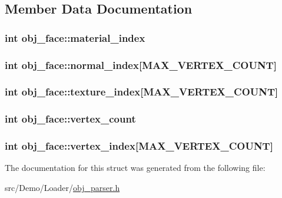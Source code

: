 \subsection{Member Data Documentation}
\hypertarget{structobj__face_ab354e6f87c96bd040a9cd6d4c4532f6b}{
\subsubsection[{material\+\_\+index}]{\setlength{\rightskip}{0pt plus 5cm}int obj\+\_\+face\+::material\+\_\+index}}\label{structobj__face_ab354e6f87c96bd040a9cd6d4c4532f6b}
\hypertarget{structobj__face_aa37ed96ceb21dde7ca0e07436f0c60bd}{
\subsubsection[{normal\+\_\+index}]{\setlength{\rightskip}{0pt plus 5cm}int obj\+\_\+face\+::normal\+\_\+index\mbox{[}{\bf M\+A\+X\+\_\+\+V\+E\+R\+T\+E\+X\+\_\+\+C\+O\+U\+N\+T}\mbox{]}}}\label{structobj__face_aa37ed96ceb21dde7ca0e07436f0c60bd}
\hypertarget{structobj__face_affde6e39f099c5f3497c3691ea66608c}{
\subsubsection[{texture\+\_\+index}]{\setlength{\rightskip}{0pt plus 5cm}int obj\+\_\+face\+::texture\+\_\+index\mbox{[}{\bf M\+A\+X\+\_\+\+V\+E\+R\+T\+E\+X\+\_\+\+C\+O\+U\+N\+T}\mbox{]}}}\label{structobj__face_affde6e39f099c5f3497c3691ea66608c}
\hypertarget{structobj__face_ac1a658f759cfb36b241a013cce1a8744}{
\subsubsection[{vertex\+\_\+count}]{\setlength{\rightskip}{0pt plus 5cm}int obj\+\_\+face\+::vertex\+\_\+count}}\label{structobj__face_ac1a658f759cfb36b241a013cce1a8744}
\hypertarget{structobj__face_a507982facfb73bcd3143d962e8aba781}{
\subsubsection[{vertex\+\_\+index}]{\setlength{\rightskip}{0pt plus 5cm}int obj\+\_\+face\+::vertex\+\_\+index\mbox{[}{\bf M\+A\+X\+\_\+\+V\+E\+R\+T\+E\+X\+\_\+\+C\+O\+U\+N\+T}\mbox{]}}}\label{structobj__face_a507982facfb73bcd3143d962e8aba781}


The documentation for this struct was generated from the following file\+:\begin{DoxyCompactItemize}
\item 
src/\+Demo/\+Loader/\hyperlink{obj__parser_8h}{obj\+\_\+parser.\+h}\end{DoxyCompactItemize}
